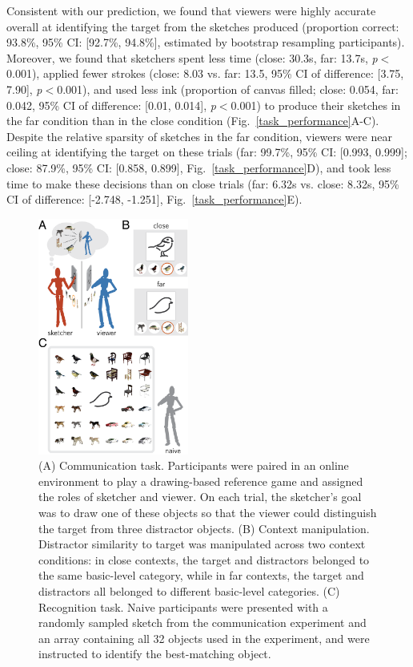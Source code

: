 \documentclass[9pt,twocolumn,twoside]{pnas-new}
\begin{document}
Consistent with our prediction, we found that viewers were highly accurate overall at identifying the target from the sketches produced (proportion correct: 93.8\%, 95\% CI: [92.7\%, 94.8\%], estimated by bootstrap resampling participants). 
Moreover, we found that sketchers spent less time (close: 30.3s, far: 13.7s, \textit{p}$<$0.001), applied fewer strokes (close: 8.03 vs. far: 13.5, 95\% CI of difference: [3.75, 7.90], \textit{p}$<$0.001), and used less ink (proportion of canvas filled; close: 0.054, far: 0.042, 95\% CI of difference: [0.01, 0.014], \textit{p}$<$0.001) to produce their sketches in the far condition than in the close condition (Fig.~\ref{task_performance}A-C). 
Despite the relative sparsity of sketches in the far condition, viewers were near ceiling at identifying the target on these trials (far: 99.7\%, 95\% CI: [0.993, 0.999]; close: 87.9\%, 95\% CI: [0.858, 0.899], Fig.~\ref{task_performance}D), and took less time to make these decisions than on close trials (far: 6.32s vs. close: 8.32s, 95\% CI of difference: [-2.748, -1.251], Fig.~\ref{task_performance}E).

\begin{figure}[t]
\centering
\includegraphics[width=0.44\textwidth]{figures/1_task_display_alt.png}
\caption{(A) Communication task. Participants were paired in an online environment to play a drawing-based reference game and assigned the roles of sketcher and viewer. On each trial, the sketcher's goal was to draw one of these objects so that the viewer could distinguish the target from three distractor objects. (B) Context manipulation. Distractor similarity to target was manipulated across two context conditions: in close contexts, the target and distractors belonged to the same basic-level category, while in far contexts, the target and distractors all belonged to different basic-level categories. (C) Recognition task. Naive participants were presented with a randomly sampled sketch from the communication experiment and an array containing all 32 objects used in the experiment, and were instructed to identify the best-matching object.}
\label{task_display}
\end{figure}
\end{document}
